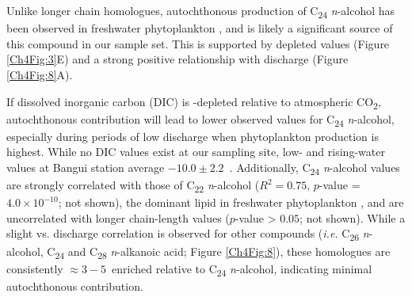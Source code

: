 Unlike longer chain homologues, autochthonous production of C\textsubscript{24} \textit{n}-alcohol has been observed in freshwater phytoplankton \citep{Volkman:1998tk,Volkman:1999tq,Xu:2007jk}, and is likely a significant source of this compound in our sample set. This is supported by depleted  values (Figure \ref{Ch4Fig:3}E) and a strong positive relationship with discharge (Figure \ref{Ch4Fig:8}A). 

If dissolved inorganic carbon (DIC) is -depleted relative to atmospheric CO\textsubscript{2}, autochthonous contribution will lead to lower observed  values for C\textsubscript{24} \textit{n}-alcohol, especially during periods of low discharge when phytoplankton production is highest. While no DIC  values exist at our sampling site, low- and rising-water values at Bangui station average $-10.0 \pm 2.2$\textperthousand\ \citep[$n = 30$;][]{Bouillon:2012cw,Bouillon:2014ko}.  Additionally, C\textsubscript{24} \textit{n}-alcohol  values are strongly correlated with those of C\textsubscript{22} \textit{n}-alcohol ($R^2 = 0.75$, $p$-value = $4.0 \times 10^{-10}$; not shown), the dominant lipid in freshwater phytoplankton \citep{Volkman:1998tk,Volkman:1999tq,Xu:2007jk}, and are uncorrelated with longer chain-length values ($p$-value > $0.05$; not shown). While a slight  vs. discharge correlation is observed for other compounds (\textit{i.e.} C\textsubscript{26} \textit{n}-alcohol, C\textsubscript{24} and C\textsubscript{28} \textit{n}-alkanoic acid; Figure \ref{Ch4Fig:8}), these homologues are consistently $\approx 3-5$\textperthousand\ enriched relative to C\textsubscript{24} \textit{n}-alcohol, indicating minimal autochthonous contribution.

